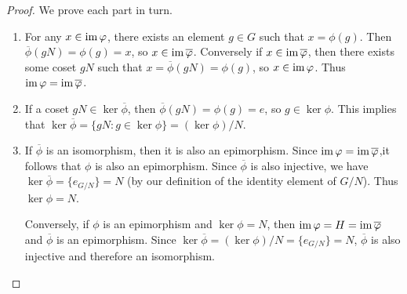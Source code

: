\begin{proof}
    We prove each part in turn.

    \begin{enumerate}[label=(\alph*), wide]
        \item For any \(x \in \operatorname{im} \varphi\), there exists an element \(g \in G\) such that \(x = \phi(g)\). Then \(\overline{\phi}(gN) = \phi(g) = x\), so \(x \in \operatorname{im} \overline{\varphi}\). Conversely if \(x \in \operatorname{im} \overline{\varphi}\), then there exists some coset \(gN\) such that \(x = \overline{\phi}(gN) = \phi(g)\), so \(x \in \operatorname{im} \varphi\). Thus \(\operatorname{im} \varphi = \operatorname{im} \overline{\varphi}\).
        
        \item If a coset \(gN \in \ker \overline{\phi}\), then \(\overline{\phi}(gN) = \phi(g) = e\), so \(g \in \ker \phi\). This implies that \(\ker \overline{\phi} = \{gN : g \in \ker \phi\} = (\ker \phi)/N\).
        
        \item If \(\overline{\phi}\) is an isomorphism, then it is also an epimorphism. Since \(\operatorname{im} \varphi = \operatorname{im} \overline{\varphi}\),it follows that \(\phi\) is also an epimorphism. Since \(\overline{\phi}\) is also injective, we have \(\ker \overline{\phi} = \{e_{G/N}\} = N\) (by our definition of the identity element of \(G/N\)). Thus \(\ker \phi = N\).
        
        Conversely, if \(\phi\) is an epimorphism and \(\ker \phi = N\), then \(\operatorname{im} \varphi = H = \operatorname{im} \overline{\varphi}\) and \(\overline{\phi}\) is an epimorphism. Since \(\ker \overline{\phi} = (\ker \phi)/N = \{e_{G/N}\} = N\), \(\overline{\phi}\) is also injective and therefore an isomorphism.
    \end{enumerate}
\end{proof}

